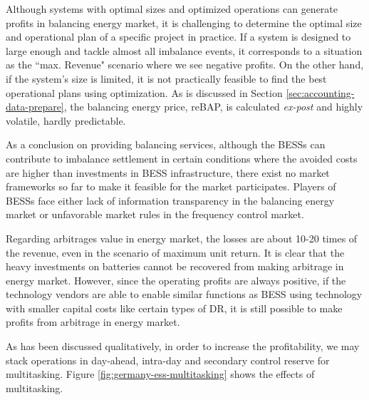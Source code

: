 Although systems with optimal sizes and optimized operations can generate profits in balancing energy market, it is challenging to determine the optimal size and operational plan of a specific project in practice. If a system is designed to large enough and tackle almost all imbalance events, it corresponds to a situation as the ``max. Revenue" scenario where we see negative profits. On the other hand, if the system's size is limited, it is not practically feasible to find the best operational plans using optimization. As is discussed in Section \ref{sec:accounting-data-prepare}, the balancing energy price, reBAP, is calculated \textit{ex-post} and highly volatile, hardly predictable. 

As a conclusion on providing balancing services, although the BESSs can contribute to imbalance settlement in certain conditions where the avoided costs are higher than investments in BESS infrastructure, there exist no market frameworks so far to make it feasible for the market participates. Players of BESSs face either lack of information transparency in the balancing energy market or unfavorable market rules in the frequency control market.

Regarding arbitrages value in energy market, the losses are about 10-20 times of the revenue, even in the scenario of maximum unit return. It is clear that the heavy investments on batteries cannot be recovered from making arbitrage in energy market. However, since the operating profits are always positive, if the technology vendors are able to enable similar functions as BESS using technology with smaller capital costs like certain types of DR, it is still possible to make profits from arbitrage in energy market.

As has been discussed qualitatively, in order to increase the profitability, we may stack operations in day-ahead, intra-day and secondary control reserve for multitasking. Figure \ref{fig:germany-ess-multitasking} shows the effects of multitasking.

